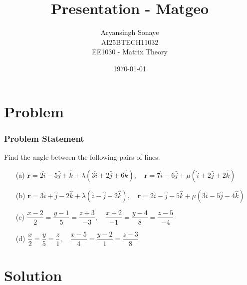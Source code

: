 \documentclass{beamer}
\title{Presentation - Matgeo}
\author{Aryansingh Sonaye \\
AI25BTECH11032 \\
EE1030 - Matrix Theory}
\date{\today}
\theoremstyle{remark}
\let\vec\mathbf
\numberwithin{equation}{section}
\begin{document}
\begin{frame}
\titlepage
\end{frame}

\section{Problem}
\begin{frame}
\frametitle{Problem Statement}
Find the angle between the following pairs of lines:

\begin{enumerate}
\item[(a)] 
$\vec{r} = 2\hat i - 5\hat j + \hat k + \lambda(3\hat i + 2\hat j + 6\hat k), 
\quad
\vec{r} = 7\hat i - 6\hat j + \mu(\hat i + 2\hat j + 2\hat k)$

\item[(b)] 
$\vec{r} = 3\hat i + \hat j - 2\hat k + \lambda(\hat i - \hat j - 2\hat k), 
\quad 
\vec{r} = 2\hat i - \hat j - 5\hat k + \mu(3\hat i - 5\hat j - 4\hat k)$

\item[(c)] 
$\dfrac{x-2}{2} = \dfrac{y-1}{5} = \dfrac{z+3}{-3}, 
\quad 
\dfrac{x+2}{-1} = \dfrac{y-4}{8} = \dfrac{z-5}{-4}$

\item[(d)] 
$\dfrac{x}{2} = \dfrac{y}{5} = \dfrac{z}{1}, 
\quad 
\dfrac{x-5}{4} = \dfrac{y-2}{1} = \dfrac{z-3}{8}$
\end{enumerate}

\end{frame}

\section{Solution}
\end{document}
